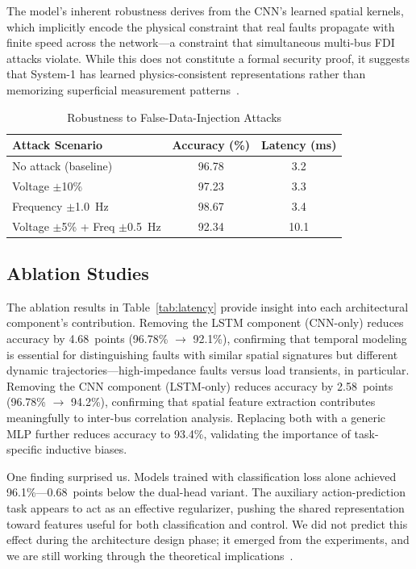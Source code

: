 \documentclass[journal]{IEEEtran}
\begin{document}
The model's inherent robustness derives from the CNN's learned spatial kernels, which implicitly encode the physical constraint that real faults propagate with finite speed across the network---a constraint that simultaneous multi-bus FDI attacks violate. While this does not constitute a formal security proof, it suggests that System-1 has learned physics-consistent representations rather than memorizing superficial measurement patterns~\cite{ref14}.

\begin{table}[!t]
\centering
\caption{Robustness to False-Data-Injection Attacks}
\label{tab:fdi}
\begin{tabular}{lcc}
\toprule
\textbf{Attack Scenario} & \textbf{Accuracy (\%)} & \textbf{Latency (ms)} \\
\midrule
No attack (baseline)        & 96.78 & 3.2 \\
Voltage $\pm$10\%           & 97.23 & 3.3 \\
Frequency $\pm$1.0~Hz       & 98.67 & 3.4 \\
Voltage $\pm$5\% + Freq $\pm$0.5~Hz & 92.34 & 10.1 \\
\bottomrule
\end{tabular}
\end{table}

\subsection{Ablation Studies}

The ablation results in Table~\ref{tab:latency} provide insight into each architectural component's contribution. Removing the LSTM component (CNN-only) reduces accuracy by 4.68~points (96.78\% $\rightarrow$ 92.1\%), confirming that temporal modeling is essential for distinguishing faults with similar spatial signatures but different dynamic trajectories---high-impedance faults versus load transients, in particular. Removing the CNN component (LSTM-only) reduces accuracy by 2.58~points (96.78\% $\rightarrow$ 94.2\%), confirming that spatial feature extraction contributes meaningfully to inter-bus correlation analysis. Replacing both with a generic MLP further reduces accuracy to 93.4\%, validating the importance of task-specific inductive biases.

One finding surprised us. Models trained with classification loss alone achieved 96.1\%---0.68~points below the dual-head variant. The auxiliary action-prediction task appears to act as an effective regularizer, pushing the shared representation toward features useful for both classification and control. We did not predict this effect during the architecture design phase; it emerged from the experiments, and we are still working through the theoretical implications~\cite{ref28}.
\end{document}
